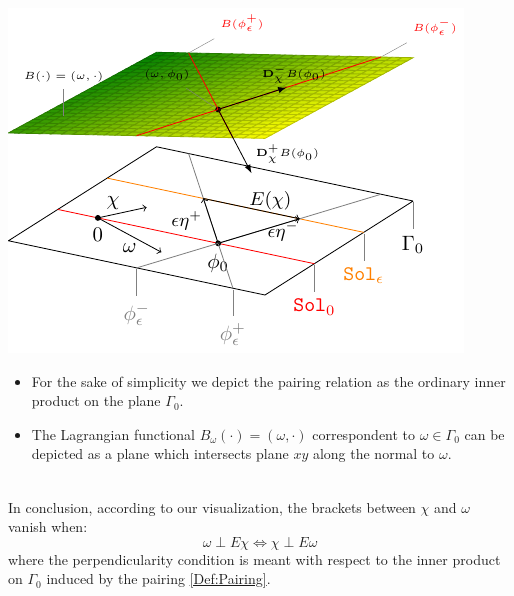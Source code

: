 \documentclass[Main]{subfiles}
\begin{document}
		\vspace{1mm}		
		\begin{minipage}{0.5\textwidth}
			\includegraphics[width=\textwidth]{Pictures/compsupp_GeometricPictureLinear}
		\end{minipage}
		\begin{minipage}{0.5\textwidth}
			\begin{itemize}
				\item For the sake of simplicity we depict the pairing relation as the ordinary inner product  on the plane $\Gamma_0$.
				\item The Lagrangian functional $B_\omega (\cdot) = (\omega, \cdot)$ correspondent to  $\omega \in \Gamma_0$  can be depicted as a plane which intersects plane $ x y$ along the normal to $\omega$.
			\end{itemize}
		\end{minipage}
		\vspace{1mm}\\	
	
		In conclusion, according to our visualization, the brackets between $\chi$ and $\omega$ vanish when:
		\begin{displaymath}
		 \omega \perp E \chi \Longleftrightarrow \chi \perp E \omega
		\end{displaymath}
		where the perpendicularity condition is meant with respect to the inner product on $\Gamma_0$ induced by the pairing \ref{Def:Pairing}.
		
\end{document}
